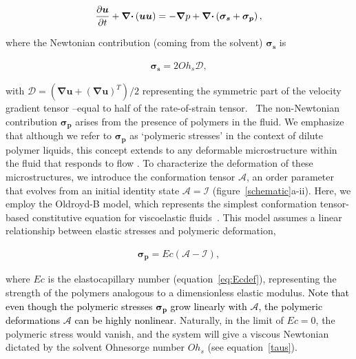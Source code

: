 \documentclass{jfm}
\newcommand{\AO}[1]{{\textcolor{black}{#1}}}
\newcommand{\oo}{\color{magenta} \normalfont}
\newcommand{\bb}{\color{black} \normalfont}
\begin{document}
\begin{align}
	\label{momconserve}
	\frac{\partial \boldsymbol{u}}{\partial t} + \boldsymbol{\nabla\cdot} \left(\boldsymbol{u}\boldsymbol{u}\right) =  -\boldsymbol{\nabla}p + \boldsymbol{\nabla\cdot}\left(\boldsymbol{\sigma_s}+\boldsymbol{\sigma_p}\right),
\end{align}

\noindent where the Newtonian contribution (coming from the solvent) $\boldsymbol{\sigma_s}$ is

\begin{align}
	\label{taus}
	\boldsymbol{\sigma_{s}} =  2 Oh_s \boldsymbol{\mathcal{D}},
\end{align}

\noindent with $\boldsymbol{\mathcal{D}} = \left(\boldsymbol{\nabla u} + \left( \boldsymbol{ \nabla u} \right) ^T \right)/2$ representing the symmetric part of the velocity gradient tensor\oo--equal to half of the rate-of-strain tensor.\bb\,
The non-Newtonian contribution $\boldsymbol{\sigma_{p}}$ arises from the presence of polymers in the fluid. We emphasize that although we refer to $\boldsymbol{\sigma_{p}}$ as `polymeric stresses' in the context of dilute polymer liquids, this concept extends to any deformable microstructure within the fluid that responds to flow \citep{saramito2007,snoeijer2020relationship,francca2024elasto,ari2024bursting}.
To characterize the deformation of these microstructures, we introduce the conformation tensor $\boldsymbol{\mathcal{A}}$, an order parameter that evolves from an initial identity state $\boldsymbol{\mathcal{A}} = \boldsymbol{\mathcal{I}}$ (figure~\ref{schematic}a-ii).
\oo Here, we employ the Oldroyd-B model, which represents the simplest conformation tensor-based constitutive equation for viscoelastic fluids \bb\,\citep{oldroyd1950formulation, bird1977dynamics, snoeijer2020relationship, stone2023note, boyko2024perspective}. This model assumes a linear relationship between elastic stresses and polymeric deformation,

\begin{align}
	\label{sigmap}
	\boldsymbol{\sigma_{p}} = Ec \left(\boldsymbol{\mathcal{A}} - \boldsymbol{\mathcal{I}}\right),
\end{align}

\noindent where $Ec$ is the elastocapillary number (equation~\eqref{eq:Ecdef}), representing the strength of the polymers analogous to a dimensionless elastic modulus. \AO{Note that even though the polymeric stresses $\boldsymbol{\sigma_{p}}$ grow linearly with $\boldsymbol{\mathcal{A}}$, the polymeric deformations $\boldsymbol{\mathcal{A}}$ can be highly nonlinear}. Naturally, in the limit of $Ec = 0$, the polymeric stress would vanish, and the system will give a viscous Newtonian dictated by the solvent Ohnesorge number $Oh_s$ (see equation~\eqref{taus}).
\end{document}
